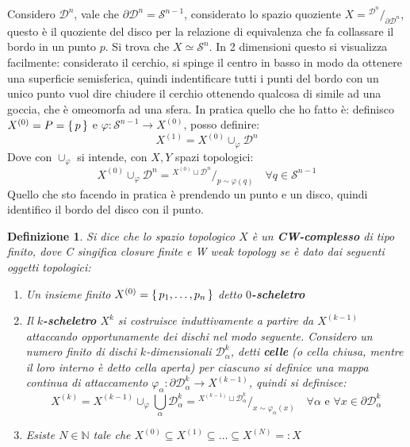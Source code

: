 \documentclass[10pt, twoside=false, x11names]{scrbook}
\newtheorem{definition}[theorem]{Definizione}
\newcommand{\Sph}[1][]{\mathcal{S}^#1}
\newcommand{\Disk}[1][]{\mathcal{D}^#1}
\newcommand*\quot[2]{{^{\textstyle #1}\big/_{\textstyle #2}}}
\let\phi\varphi
\begin{document}
Considero $ \Disk{n} $, vale che $ \partial\Disk{n} = \Sph{n-1} $, considerato lo spazio quoziente
$ X = \quot{\Disk{n}}{\partial \Disk{n}} $, questo è il quoziente del disco per la relazione
di equivalenza che fa collassare il bordo in un punto $ p $. Si trova che $ X \simeq \Sph{n} $.
In 2 dimensioni questo si visualizza facilmente: considerato il cerchio, si spinge il centro
in basso in modo da ottenere una superficie semisferica, quindi indentificare tutti i punti
del bordo con un unico punto vuol dire chiudere il cerchio ottenendo qualcosa di simile ad
una goccia, che è omeomorfa ad una sfera. In pratica quello che ho fatto è:
definisco $ X^{(0)} = P = \set{p} $ e $ \phi \colon \Sph{n-1} \to X^{(0)} $, posso definire:
\[
  X^{(1)} = X^{(0)} \cup_\phi \Disk{n}
\]
Dove con $ \cup_\phi $ si intende, con $ X, Y $ spazi topologici:
\[
  X^{(0)} \cup_\phi \Disk{n} = \quot{X^{(0)} \sqcup \Disk{n}}{p \sim \phi(q)} \quad \forall q \in \Sph{n-1}
\]
Quello che sto facendo in pratica è prendendo un punto e un disco, quindi
identifico il bordo del disco con il punto.


\begin{definition}
  Si dice che lo spazio topologico $ X $ è un \textbf{CW-complesso} di tipo finito,
  dove C singifica \emph{closure finite} e W \emph{weak topology} se è dato dai seguenti oggetti topologici:
  \begin{enumerate}
  \item Un insieme finito $ X^{(0)} = \set{p_1, \dots, p_n} $ detto \textbf{$ 0 $-scheletro}
  \item Il \textbf{$ k $-scheletro} $ X^{k} $ si costruisce induttivamente
    a partire da $ X^{(k-1)} $ attaccando opportunamente dei dischi nel modo seguente.
    Considero un numero finito di dischi $ k $-dimensionali $ \Disk{k}_\alpha $,
    detti \textbf{celle} (o cella chiusa, mentre
    il loro interno è detto cella aperta) per ciascuno si definice una mappa
    continua di attaccamento $ \phi_\alpha \colon \partial\Disk{k}_\alpha \to X^{(k-1)} $, quindi si definisce:
    \[
      X^{(k)} = X^{(k-1)} \cup_\phi \bigcup_\alpha \Disk{k}_\alpha = \quot{ X^{(k-1)} \sqcup \Disk{k}_\alpha}{x \sim \phi_\alpha(x)} \quad \forall \alpha \text{ e }
      \forall x \in \partial \Disk{k}_\alpha
    \]
  \item Esiste $ N \in \mathbb{N} $ tale che $ X^{(0)} \subseteq X^{(1)} \subseteq \dots \subseteq X^{(N)} =: X $
  \end{enumerate}
\end{definition}
\end{document}
